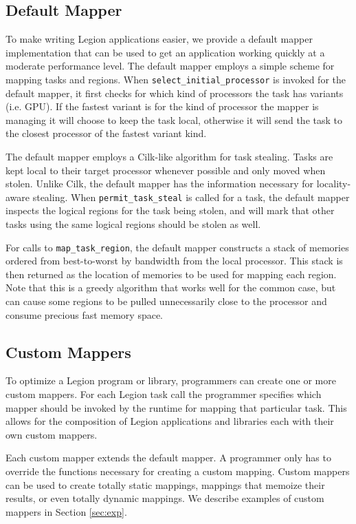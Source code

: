 \subsection{Default Mapper}
\label{sec:defmapper}
To make writing Legion applications easier, we provide a default mapper implementation that
can be used to get an application working quickly at a moderate performance level.  The 
default mapper employs a simple scheme for mapping tasks and regions.  When
{\tt select\_initial\_processor} is invoked for the default mapper, it first checks for which kind of processors
the task has variants (i.e. GPU).  If the fastest variant is for the kind of processor the mapper is managing
it will choose to keep the task local, otherwise it will send the task to the closest processor of the
fastest variant kind.

The default mapper employs a Cilk-like algorithm for task stealing\cite{CILK95}.  Tasks are kept local
to their target processor whenever possible and only moved when stolen.  Unlike Cilk, the default mapper
has the information necessary for locality-aware stealing.  When {\tt permit\_task\_steal} is called for a task, 
the default mapper inspects the logical regions for the task being stolen, and will mark that other tasks using 
the same logical regions should be stolen as well.

For calls to {\tt map\_task\_region}, the default mapper constructs a stack of memories ordered from best-to-worst
by bandwidth from the local processor.  This stack is then returned as the location of memories to be used for
mapping each region.  Note that this is a greedy algorithm that works well for the common case, but can cause some 
regions to be pulled unnecessarily close to the processor and consume precious fast memory space.  

\subsection{Custom Mappers}
\label{sec:custommap}
To optimize a Legion program or library, programmers can create one or more custom mappers.  
For each Legion task call the programmer specifies which mapper should be invoked by the runtime for
mapping that particular task.  This allows for the composition of Legion applications and libraries
each with their own custom mappers.

Each custom mapper extends the default mapper.  A programmer only has to override the functions necessary 
for creating a custom mapping.  Custom mappers can be used to create totally static mappings, 
mappings that memoize their results, or even totally dynamic mappings.  We describe examples of 
custom mappers in Section \ref{sec:exp}.




